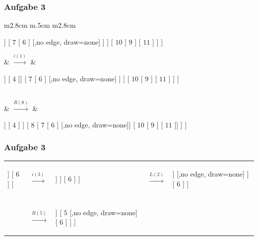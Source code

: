 \documentclass{beamer}
\begin{document}
\begin{frame} \frametitle{Aufgabe 3}
	\footnotesize
	\begin{tabularx}{\linewidth}{m{2.8cm} m{.5cm} m{2.8cm}}
		\begin{forest}
			[ $8$ [ $5$ [ $3$ [ $2$ ] [ $4$ ]] [ $7$ [ $6$ ] [,no edge, draw=none]  ] ] [ $10$ [ $9$ ] [ $11$ ] ] ]
		\end{forest}
		&
		$\overset{i(1)}{\longrightarrow}$
		&
		\begin{forest}
			[ $8^{-2}$ [ $5^{-1}$ [ $3^{-1}$ [ $2^{-1}$ [ $1^0$ ] [,no edge, draw=none]] [ $4$ ]] [ $7$ [ $6$ ] [,no edge, draw=none]  ] ] [ $10$ [ $9$ ] [ $11$ ] ] ]
		\end{forest} 
		\\
		&
		$\overset{R(8)}{\longrightarrow}$
		&
		\begin{forest}
			[ $5$ [ $3$ [ $2$ [ $1$ ] [,no edge, draw=none] ] [ $4$ ] ] [ $8$ [ $7$ [ $6$ ] [,no edge, draw=none]] [ $10$ [ $9$ ] [ $11$ ]] ] ]
		\end{forest} 
	\end{tabularx}
\end{frame}

\begin{frame} \frametitle{Aufgabe 3}
	\small
	\begin{tabularx}{\linewidth}{m{2cm} m{.5cm} m{2.5cm} m{.5cm} m{2cm}}
		\begin{forest}
			[ $5$ [ $2$ [ $1$ ] [ $4$ ] ] [ $6$ ] ]
		\end{forest} 
		&
		$\overset{i(3)}{\longrightarrow}$
		&
		\begin{forest}
			[ $5^{-2}$ [ $2^{1}$ [ $1$ ] [ $4^{-1}$ [ $3^0$ ] [,no edge, draw=none]] ] [ $6$ ] ]
		\end{forest} 
		&
		$\overset{L(2)}{\longrightarrow}$
		&
		\begin{forest}
			[ $5$ [ $4$ [ $2$ [ $1$ ] [ $3$ ] ] [,no edge, draw=none] ] [ $6$ ] ]
		\end{forest}  \\ \\
		& $\overset{R(5)}{\longrightarrow}$
		& 
		\begin{forest}
			[ $4$ [ $2$ [ $1$ ] [ $3$ ]] [ $5$ [,no edge, draw=none] [ $6$ ] ] ]
		\end{forest}
	\end{tabularx}\end{frame}
\end{document}
